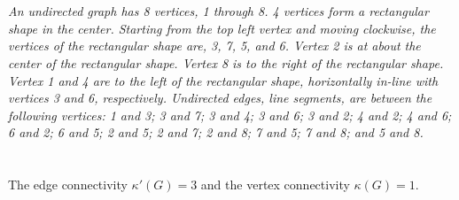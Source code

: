 \documentclass{amsart}
\theoremstyle{definition}
\theoremstyle{Exercise}
\theoremstyle{remark}
\theoremstyle{rule}
\numberwithin{equation}{section}
\begin{document}
\begin{enumerate}[label=(\alph*)]
\begin{enumerate}[label=(\roman*)]
\\\\
{\color{blue}{\bf Figure 8:} \emph{An undirected graph has 8 vertices, 1 through 8. 4 vertices form a rectangular shape in the center. Starting from the top left vertex and moving clockwise, the vertices of the rectangular shape are, 3, 7, 5, and 6. Vertex 2 is at about the center of the rectangular shape. Vertex 8 is to the right of the rectangular shape. Vertex 1 and 4 are to the left of the rectangular shape, horizontally in-line with vertices 3 and 6, respectively. Undirected edges, line segments, are between the following vertices: 1 and 3; 3 and 7; 3 and 4; 3 and 6; 3 and 2; 4 and 2; 4 and 6; 6 and 2; 6 and 5; 2 and 5; 2 and 7; 2 and 8; 7 and 5; 7 and 8; and 5 and 8. 
\\
}
}
\\
\\
The edge connectivity $\kappa'(G) = 3$ and the vertex connectivity $\kappa(G) = 1$.
\\\\
    \end{enumerate}
\end{enumerate}



 \newpage
\end{document}
